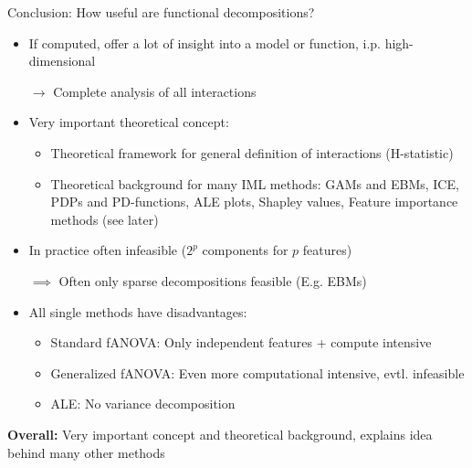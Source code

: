 \documentclass[10pt,compress,t,notes=noshow, xcolor=table]{beamer}
\begin{document}
\begin{frame}{Conclusion: How useful are functional decompositions?}
\begin{itemize}
        \item If computed, offer a lot of insight into a model or function, i.p. high-dimensional
        \item[$\rightarrow$] Complete analysis of all interactions
        \pause
        \item Very important theoretical concept:
        \begin{itemize}
            \item Theoretical framework for general definition of interactions (H-statistic)
            \item Theoretical background for many IML methods:
                GAMs and EBMs, 
                ICE, PDPs and PD-functions,
                ALE plots,
                Shapley values,
                Feature importance methods (see later)
        \end{itemize}
        \pause
        \item In practice often infeasible ($2^p$ components for $p$ features)
        \item[$\implies$] Often only sparse decompositions feasible (E.g. EBMs)
        \pause
        \item All single methods have disadvantages:
        \begin{itemize}
            \item Standard fANOVA: Only independent features + compute intensive
            \item Generalized fANOVA: Even more computational intensive, evtl. infeasible
            \item ALE: No variance decomposition
        \end{itemize}
        
    \end{itemize}

    \pause
    \textbf{Overall:} Very important concept and theoretical background, explains idea behind many other methods
    
\end{frame}










\endlecture
\end{document}
